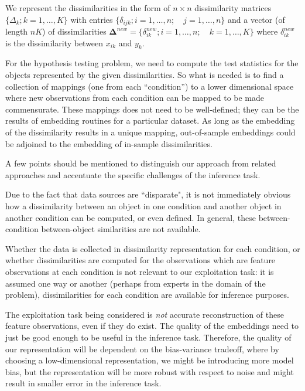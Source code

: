 \documentclass[12pt,oneside,final]{thesis}\usepackage[]{graphicx}\usepackage[]{color}
\begin{document}
We represent the dissimilarities in the form  of $n \times n$  dissimilarity matrices $\{\Delta_k;k=1,\ldots,K\}$ with entries $\{\delta_{ijk} ;  i=1,\ldots,n;\quad j=1,\ldots,n\}$  and a  vector (of length $nK$) of dissimilarities  $\mathbf{\Delta}^{new}=\{ \delta_{ik}^{new}; i=1,\ldots, n;\quad k=1,\ldots,K\}  $  where $\delta_{ik}^{new} $ is the dissimilarity  between  $x_{ik}$ and $y_k$.
 
 
For the hypothesis testing problem, we need to compute the test statistics for the objects represented by the given dissimilarities. So what is needed is to find a collection of mappings (one from each ``condition'') to a lower dimensional space where new observations from each condition can be mapped to be made commensurate. These mappings does not need to be  well-defined; they can be the results of embedding routines for a particular dataset. As long as the embedding of the dissimilarity results in a  unique mapping,  out-of-sample embeddings could be adjoined to the embedding of in-sample dissimilarities.

A few points should be mentioned to distinguish our approach from related approaches and accentuate the specific challenges of the inference task.
\begin{remark}
Due to the fact that data sources are ``disparate", it is not immediately obvious how  a dissimilarity between an object in one condition and another object in another condition  can be computed, or even defined.  In general, these between-condition between-object  similarities are not available.
\label{rem:between_cond_diss}
\end{remark}
 
 \begin{remark}
 Whether the data is collected in dissimilarity representation for each condition, or whether dissimilarities are computed for the observations which are feature observations at each condition is not relevant to our exploitation task: it is assumed one way or another (perhaps from experts in the domain of the problem),  dissimilarities for each condition are available for inference purposes. 
\end{remark}

\begin{remark}
The exploitation task  being considered is \emph{not} accurate reconstruction of these feature observations, even if they do exist. The quality of the  embeddings need to just be  good enough to be useful in the inference task. Therefore, the quality of our representation will be dependent on the bias-variance tradeoff, where by choosing a low-dimensional representation, we might be introducing more model bias, but the representation will be more  robust with respect to noise and might result in smaller error in the inference task.
\end{remark}
\end{document}
